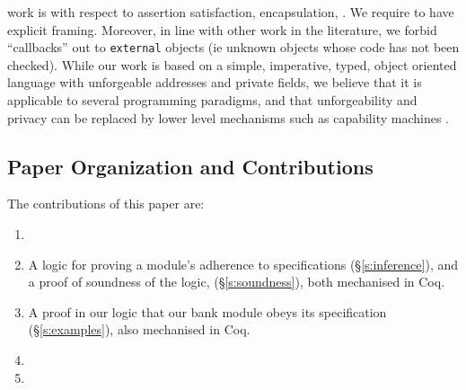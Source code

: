 \vspace{.02in}
 work %
is  with respect to assertion
satisfaction, encapsulation, .
We require  
\funcSpecs to have explicit framing.
{{Moreover, in line} with other work in the literature,} we forbid 
``callbacks'' out to  { \color{blue}\texttt{external}} objects (ie unknown objects
whose code has not been checked).   While our work is based on 
  a simple, imperative, typed, object oriented
language with unforgeable addresses and private fields, we believe
 that %
 it is applicable to several programming paradigms, and 
 that   unforgeability and privacy
 can be replaced 
 by lower level mechanisms such as capability machines \cite{vanproving,davis2019cheriabi}.
 


\subsection{Paper Organization and Contributions}


%
The contributions of this paper are:
\begin{enumerate}
\item {}

 \item
A logic for proving a module's adherence to 
 \Nec specifications (\S\ref{s:inference}), and a proof of soundness of the logic, (\S\ref{s:soundness}),
both mechanised in Coq. 
 \item
A proof in our logic %
  that our bank module obeys its \Nec specification (\S\ref{s:examples}),  also  mechanised in Coq.
\item {}
\item {}

\end{enumerate}



